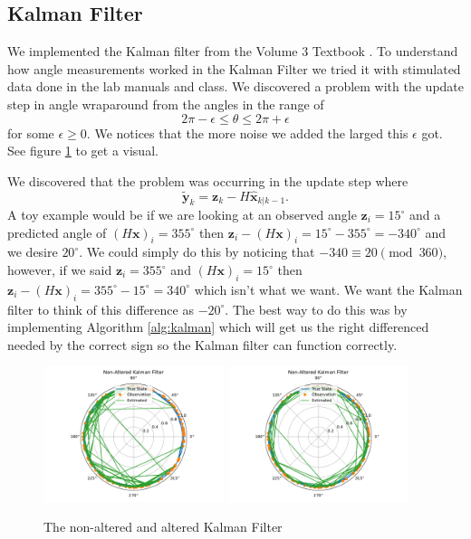 \documentclass[11pt]{amsart}
\begin{document}
\subsection{Kalman Filter}
We implemented the Kalman filter from the Volume 3 Textbook \cite{V3}. To understand how angle measurements worked in the Kalman Filter we tried it with
stimulated data done in the lab manuals and class. We discovered a problem with the update step in angle wraparound from the angles in the range of 
\[2\pi - \epsilon \leq \theta \leq 2\pi + \epsilon\] for some $\epsilon \geq 0$. We notices that the more noise we added the larged this $\epsilon$ got. 
See figure \ref{fig:simple_kalman} to get a visual.

We discovered that the problem was occurring in the update step where \[\mathbf{\tilde{y}}_k = \mathbf{z}_k - H\mathbf{\hat{x}}_{k|k-1}.\]
A toy example would be if we are looking at an observed angle $\mathbf{z}_i = 15^{\circ}$ and a predicted angle of $(H\mathbf{x})_i = 355^{\circ}$ 
then $\mathbf{z}_i - (H\mathbf{x})_i = 15^{\circ} - 355^{\circ} = -340^{\circ}$ and we desire $20^{\circ}$. We could simply do this by noticing that $-340 \equiv 20 \pmod {360}$,
however, if we said $\mathbf{z}_i=355^{\circ}$ and $(H\mathbf{x})_i = 15^{\circ}$ then $\mathbf{z}_i - (H\mathbf{x})_i = 355^{\circ} - 15^{\circ} = 340^{\circ}$ which isn't what we want.
We want the Kalman filter to think of this difference as $-20^{\circ}$. The best way to do this was by implementing Algorithm \ref{alg:kalman} which will get us the right differenced needed by 
the correct sign so the Kalman filter can function correctly.

\begin{figure}[htp]
    \centering
    \includegraphics[width=0.47\textwidth]{non_altered_kalman.pdf}\hfill
    \includegraphics[width=0.47\textwidth]{altered_kalman.pdf}\hfill
    \caption{The non-altered and altered Kalman Filter}
    \label{fig:simple_kalman}
\end{figure}
\end{document}

